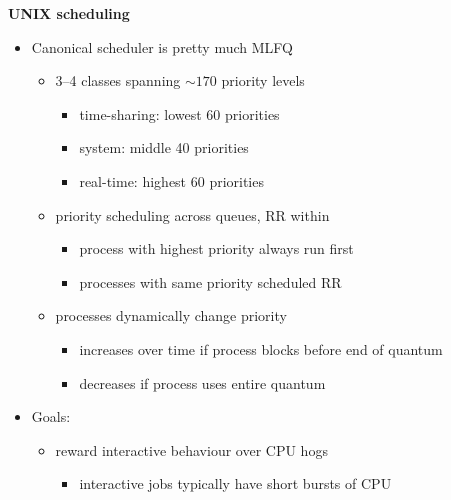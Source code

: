 \documentclass[11pt,a4paper]{article}
\begin{document}
\textbf{UNIX scheduling}
\begin{itemize}
    \item Canonical scheduler is pretty much MLFQ
        \begin{itemize}
            \item 3--4 classes spanning $\sim170$ priority levels
                \begin{itemize}
                    \item time-sharing: lowest 60 priorities
                    \item system: middle 40 priorities
                    \item real-time: highest 60 priorities
                \end{itemize}
            \item priority scheduling across queues, RR within
                \begin{itemize}
                    \item process with highest priority always run first
                    \item processes with same priority scheduled RR
                \end{itemize}
            \item processes dynamically change priority
                \begin{itemize}
                    \item increases over time if process blocks before end of quantum
                    \item decreases if process uses entire quantum
                \end{itemize}
        \end{itemize}
    \item Goals:
        \begin{itemize}
            \item reward interactive behaviour over CPU hogs
                \begin{itemize}
                    \item interactive jobs typically have short bursts of CPU
                \end{itemize}
        \end{itemize}
\end{itemize}
\end{document}
